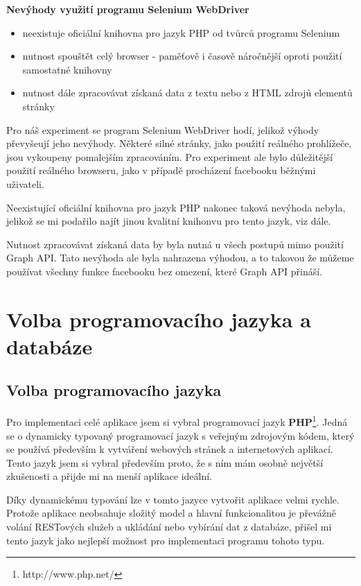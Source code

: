 \documentclass[thesis=M,czech]{FITthesis}[2013/05/10]
\begin{document}
\textbf{Nevýhody využití programu Selenium WebDriver}

\begin{itemize}
  \item neexistuje oficiální knihovna pro jazyk PHP 
  od tvůrců programu Selenium
  \item nutnost spouštět celý browser - paměťově i časově náročnější
  oproti použití samostatné knihovny
  \item nutnost dále zpracovávat získaná data z textu nebo z HTML zdrojů elementů stránky
\end{itemize}

Pro náš experiment se program Selenium WebDriver hodí, jelikož výhody převyšeují jeho nevýhody. Některé silné stránky, jako použití reálného prohlížeče, jsou vykoupeny pomalejším zpracováním. Pro experiment ale bylo důležitější použití reálného browseru, jako v případě procházení facebooku běžnými uživateli.

Neexistující oficiální knihovna pro jazyk PHP nakonec taková nevýhoda nebyla, jelikož se mi podařilo najít jinou kvalitní knihonvu pro tento jazyk, viz dále.

Nutnost zpracovávat získaná data by byla nutná u všech postupů mimo použití Graph API. Tato nevýhoda ale byla nahrazena výhodou, a to takovou že můžeme používat všechny funkce facebooku bez omezení, které Graph API přináší.

\section{Volba programovacího jazyka a databáze}

\subsection{Volba programovacího jazyka}

Pro implementaci celé aplikace jsem si vybral programovací jazyk \textbf{PHP}\footnote{http://www.php.net/}. Jedná se o dynamicky typovaný programovací jazyk s veřejným zdrojovým kódem, který se používá především k vytváření webových stránek a internetových aplikací. Tento jazyk jsem si vybral především proto, že s ním mám osobně největší zkušenosti a přijde mi na menší aplikace ideální. 

Díky dynamickému typování lze v tomto jazyce vytvořit aplikace velmi rychle. Protože aplikace neobsahuje složitý model a hlavní funkcionalitou je převážně volání RESTových služeb a ukládání nebo vybírání dat z databáze, přišel mi tento jazyk jako nejlepší možnost pro implementaci programu tohoto typu.
\end{document}

